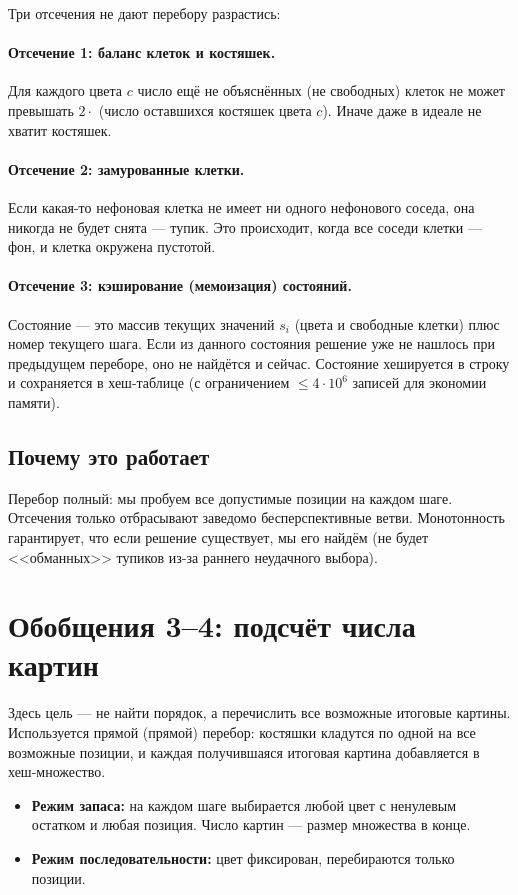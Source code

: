 \documentclass[12pt,a4paper]{article}
\begin{document}
Три отсечения не дают перебору разрастись:

\paragraph{Отсечение 1: баланс клеток и костяшек.}
Для каждого цвета $c$ число ещё не объяснённых (не свободных) клеток
не может превышать $2\cdot$ (число оставшихся костяшек цвета $c$).
Иначе даже в идеале не хватит костяшек.

\paragraph{Отсечение 2: замурованные клетки.}
Если какая-то нефоновая клетка не имеет ни одного нефонового соседа,
она никогда не будет снята --- тупик. Это происходит, когда все соседи
клетки --- фон, и клетка окружена пустотой.

\paragraph{Отсечение 3: кэширование (мемоизация) состояний.}
Состояние --- это массив текущих значений $s_i$ (цвета и свободные
клетки) плюс номер текущего шага. Если из данного состояния решение
уже не нашлось при предыдущем переборе, оно не найдётся и сейчас.
Состояние хешируется в строку и сохраняется в хеш-таблице
(с ограничением $\le 4\cdot10^6$ записей для экономии памяти).

\subsection{Почему это работает}

Перебор полный: мы пробуем все допустимые позиции на каждом шаге.
Отсечения только отбрасывают заведомо бесперспективные ветви.
Монотонность гарантирует, что если решение существует, мы его найдём
(не будет <<обманных>> тупиков из-за раннего неудачного выбора).

\section{Обобщения 3--4: подсчёт числа картин}

Здесь цель --- не найти порядок, а перечислить все возможные итоговые
картины. Используется прямой (прямой) перебор: костяшки кладутся по
одной на все возможные позиции, и каждая получившаяся итоговая картина
добавляется в хеш-множество.

\begin{itemize}
  \item \textbf{Режим запаса:} на каждом шаге выбирается любой цвет
        с ненулевым остатком и любая позиция. Число картин --- размер
        множества в конце.
  \item \textbf{Режим последовательности:} цвет фиксирован, перебираются
        только позиции.
\end{itemize}
\end{document}
